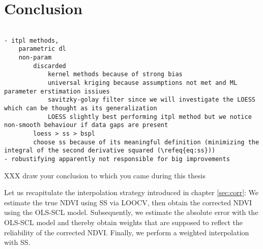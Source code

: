 \chapter{Conclusion}
\label{s:Conclusion}
\begin{verbatim}
    
- itpl methods, 
    parametric dl 
    non-param 
        discarded 
            kernel methods because of strong bias  
            universal kriging because assumptions not met and ML parameter erstimation issiues
            savitzky-golay filter since we will investigate the LOESS which can be thought as its generalization 
            LOESS slightly best performing itpl method but we notice non-smooth behaviour if data gaps are present
        loess > ss > bspl
        choose ss because of its meaningful definition (minimizing the integral of the second derivative squared (\refeq{eq:ss}))
- robustifying apparently not responsible for big improvements

\end{verbatim}
XXX draw your conclusion to which you came during this thesis

Let us recapitulate the interpolation strategy introduced in chapter \ref{sec:corr}: We estimate the true NDVI using SS via LOOCV, then obtain the corrected NDVI using the OLS-SCL model. Subsequently, we estimate the absolute error with the OLS-SCL model and thereby obtain weights that are supposed to reflect the reliability of the corrected NDVI. Finally, we perform a weighted interpolation with SS.

